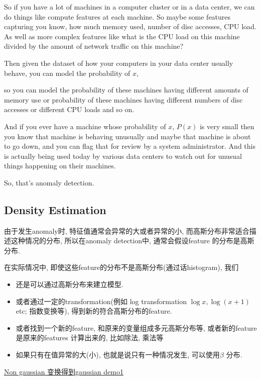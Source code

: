 \documentclass{article}
\begin{document}
\begin{example}
So if you have a lot of machines in a computer cluster or in a data center, we can do things like compute features at each machine.
So maybe some features capturing you know, how much memory used, number of disc accesses, CPU load.  
As well as more complex features like what is the CPU load on this machine divided by the amount of network traffic on this machine?

Then given the dataset of how your computers in your data center usually behave, you can model the probability of $x$, 

so you can model the probability of these machines having different amounts of memory use or probability of these machines having different numbers of disc accesses or 
different CPU loads and so on.

And if you ever have a machine whose probability of $x$, $P(x)$ is very small then you know that machine is behaving unusually and maybe that machine is about to go down, 
and you can flag that for review by a system administrator.  
And this is actually being used today by various data centers to watch out for unusual things happening on their machines.  
\end{example}
So, that's anomaly detection.

\subsection{Density Estimation}
由于发生anomaly时, 特征值通常会异常的大或者异常的小, 而高斯分布非常适合描述这种情况的分布, 
所以在anomaly detection中, 通常会假设feature 的分布是高斯分布.

在实际情况中, 即使这些feature的分布不是高斯分布(通过话histogram), 我们
\begin{itemize}
\item 还是可以通过高斯分布来建立模型. 
\item 或者通过一定的transformation(例如 log transformation $\log x, \log (x+1)$ etc; 指数变换等), 得到新的符合高斯分布的feature.
\item 或者找到一个新的feature, 和原来的变量组成多元高斯分布等, 或者新的feature 是原来的features 计算出来的, 比如除法, 乘法等
\item 如果只有在值异常的大(小), 也就是说只有一种情况发生, 可以使用$\beta$ 分布.
\end{itemize}

\href{http://i.imgbox.com/ruQqbdWM.png}{Non gaussian 变换得到gaussian demo1}
\end{document}
